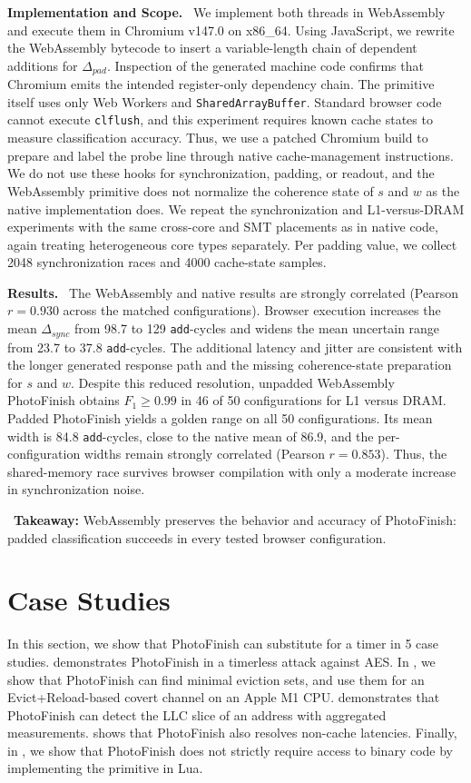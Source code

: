 \documentclass[letterpaper,twocolumn,10pt]{article} %
\newcommand{\paragrabf}[1]{\noindent \textbf{#1.}\ }
\newcommand{\AttackName}{PhotoFinish\xspace}
\newcommand{\rdelta}[1]{$\Delta_{#1}$}
\newcommand{\takeaway}[1]{%
\begin{tcolorbox}[boxsep=1pt,left=2pt,right=2pt,top=1pt,bottom=1pt]
    \faLightbulb[regular]~\textbf{Takeaway:} #1
\end{tcolorbox}
}
\begin{document}
\paragrabf{Implementation and Scope}
We implement both threads in WebAssembly and execute them in Chromium v147.0 on x86\_64.
Using JavaScript, we rewrite the WebAssembly bytecode to insert a variable-length chain of dependent additions for \rdelta{pad}.
Inspection of the generated machine code confirms that Chromium emits the intended register-only dependency chain.
The primitive itself uses only Web Workers and \texttt{SharedArrayBuffer}.
Standard browser code cannot execute \texttt{clflush}, and this experiment requires known cache states to measure classification accuracy.
Thus, we use a patched Chromium build to prepare and label the probe line through native cache-management instructions.
We do not use these hooks for synchronization, padding, or readout, and the WebAssembly primitive does not normalize the coherence state of $s$ and $w$ as the native implementation does.
We repeat the synchronization and L1-versus-DRAM experiments with the same cross-core and SMT placements as in native code, again treating heterogeneous core types separately.
Per padding value, we collect \num{2048} synchronization races and \num{4000} cache-state samples.

\paragrabf{Results}
The WebAssembly and native results are strongly correlated (Pearson $r=0.930$ across the matched configurations).
Browser execution increases the mean \rdelta{sync} from \num{98.7} to \num{129} \texttt{add}-cycles and widens the mean uncertain range from \num{23.7} to \num{37.8} \texttt{add}-cycles.
The additional latency and jitter are consistent with the longer generated response path and the missing coherence-state preparation for $s$ and $w$.
Despite this reduced resolution, unpadded WebAssembly \AttackName obtains $F_1\geq0.99$ in \num{46} of \num{50} configurations for L1 versus DRAM.
Padded \AttackName yields a golden range on all \num{50} configurations.
Its mean width is \num{84.8} \texttt{add}-cycles, close to the native mean of \num{86.9}, and the per-configuration widths remain strongly correlated (Pearson $r=0.853$).
Thus, the shared-memory race survives browser compilation with only a moderate increase in synchronization noise.

\takeaway{WebAssembly preserves the behavior and accuracy of \AttackName: padded classification succeeds in every tested browser configuration.}


\section{Case Studies}\label{sec:case-studies}
In this section, we show that \AttackName can substitute for a timer in \num{5} case studies.
 demonstrates \AttackName in a timerless attack against AES\@.
In , we show that \AttackName can find minimal eviction sets, and use them for an Evict+Reload-based covert channel on an Apple M1 CPU\@.
 demonstrates that \AttackName can detect the LLC slice of an address with aggregated measurements.
 shows that \AttackName also resolves non-cache latencies.
Finally, in , we show that \AttackName does not strictly require access to binary code by implementing the primitive in Lua.
\end{document}
